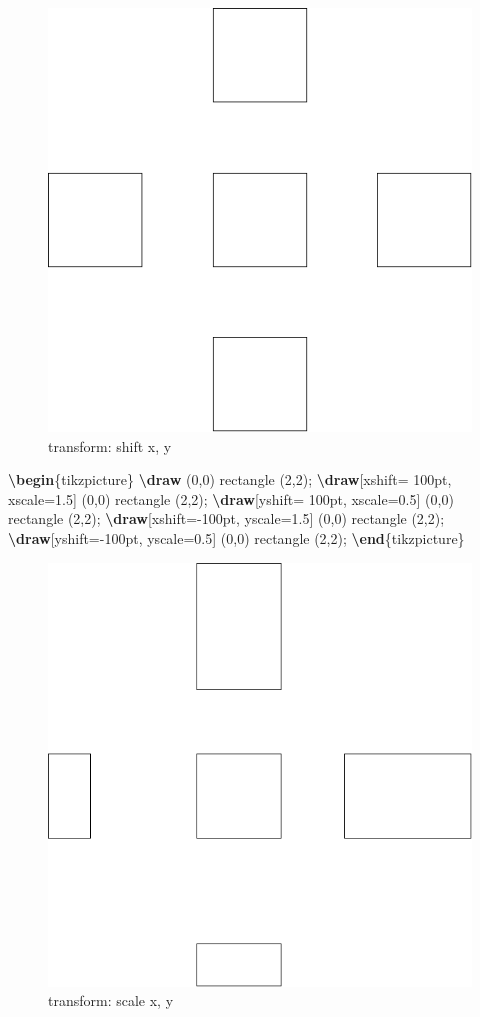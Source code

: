 \documentclass[
]{book}
\newenvironment{Shaded}{\begin{snugshade}}{\end{snugshade}}
\newcommand{\ExtensionTok}[1]{#1}
\newcommand{\FunctionTok}[1]{\textcolor[rgb]{0.13,0.29,0.53}{\textbf{#1}}}
\newcommand{\KeywordTok}[1]{\textcolor[rgb]{0.13,0.29,0.53}{\textbf{#1}}}
\newcommand{\NormalTok}[1]{#1}
\theoremstyle{definition}
\theoremstyle{definition}
\theoremstyle{definition}
\theoremstyle{definition}
\theoremstyle{remark}
\begin{document}
\begin{figure}
\includegraphics[width=0.75\linewidth]{202401311000-TikZ_files/figure-latex/unnamed-chunk-47-1} \caption{transform: shift x, y}\label{fig:unnamed-chunk-47}
\end{figure}

\begin{Shaded}
\begin{Highlighting}[]
\KeywordTok{\textbackslash{}begin}\NormalTok{\{}\ExtensionTok{tikzpicture}\NormalTok{\}}
  \FunctionTok{\textbackslash{}draw}\NormalTok{ (0,0) rectangle (2,2);}
  \FunctionTok{\textbackslash{}draw}\NormalTok{[xshift= 100pt, xscale=1.5] (0,0) rectangle (2,2);}
  \FunctionTok{\textbackslash{}draw}\NormalTok{[yshift= 100pt, xscale=0.5] (0,0) rectangle (2,2);}
  \FunctionTok{\textbackslash{}draw}\NormalTok{[xshift={-}100pt, yscale=1.5] (0,0) rectangle (2,2);}
  \FunctionTok{\textbackslash{}draw}\NormalTok{[yshift={-}100pt, yscale=0.5] (0,0) rectangle (2,2);}
\KeywordTok{\textbackslash{}end}\NormalTok{\{}\ExtensionTok{tikzpicture}\NormalTok{\}}
\end{Highlighting}
\end{Shaded}

\begin{figure}
\includegraphics[width=0.75\linewidth]{202401311000-TikZ_files/figure-latex/unnamed-chunk-49-1} \caption{transform: scale x, y}\label{fig:unnamed-chunk-49}
\end{figure}
\end{document}
